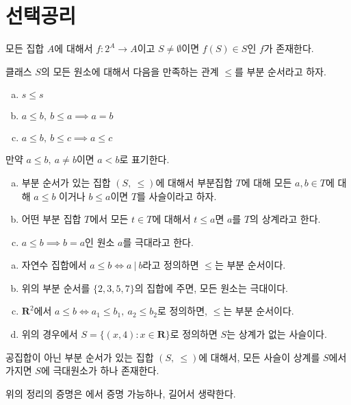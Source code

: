 \section{선택공리}
\begin{axiom}[선택공리]
\label{AoC}
	모든 집합 $A$에 대해서 $f : 2^A \to A$이고 $S \neq \emptyset$이면 $f(S) \in S$인 $f$가 존재한다.
\end{axiom}
\begin{definition}
	클래스 $S$의 모든 원소에 대해서 다음을 만족하는 관계 $\leq$를 부분 순서라고 하자.
	\begin{enumerate}[(a)]
		\item $s \leq s$ 
		\item $a \leq b,\: b \leq a \implies a = b$
		\item $a \leq b,\: b \leq c \implies a \leq c$
	\end{enumerate}
	만약 $a \leq b,\: a \neq b$이면 $a < b$로 표기한다.
\end{definition}
\begin{definition}
	\begin{enumerate}[(a)]
		\item 부분 순서가 있는 집합 $(S,\: \leq)$에 대해서 부분집합 $T$에 대해
		모든 $a, b \in T$에 대해 $a \leq b$ 이거나 $b \leq a$이면 $T$를 사슬이라고 하자.
		\item 어떤 부분 집합 $T$에서 모든 $t \in T$에 대해서 $t \leq a$면 $a$를 $T$의 상계라고 한다.
		\item $a \leq b \implies b = a$인 원소 $a$를 극대라고 한다.
	\end{enumerate}
\end{definition}
\begin{example}
	\begin{enumerate}[(a)]
		\item 자연수 집합에서 $a \leq b \iff a\:|\:b$라고 정의하면 $\leq$는 부분 순서이다.
		\item 위의 부분 순서를 $\{2, 3, 5, 7\}$의 집합에 주면, 모든 원소는 극대이다.
		\item $\mathbf{R}^2$에서 $a \leq b \iff a_1 \leq b_1,\: a_2 \leq b_2$로 정의하면, $\leq$는 부분 순서이다.
		\item 위의 경우에서 $S = \{(x, 4) : x \in \mathbf{R} \}$로 정의하면 $S$는 상계가 없는 사슬이다.
	\end{enumerate}
\end{example}

\begin{theorem}
	공집합이 아닌 부분 순서가 있는 집합 $(S,\: \leq)$에 대해서, 모든 사슬이 상계를 $S$에서 가지면 $S$에 극대원소가 하나 존재한다.
\end{theorem}
\begin{remark}
	위의 정리의 증명은 에서 증명 가능하나, 길어서 생략한다.
\end{remark}

